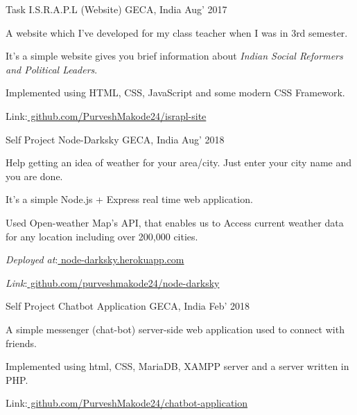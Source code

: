 \begin{cventries}
  \cventry
    {Task} %
    {I.S.R.A.P.L (Website)} %
    {GECA, India} %
    {Aug’ 2017} %
    {
      \begin{cvitems} %
        \item {A website which I’ve developed for my class teacher when I was in 3rd semester. }
        \item {It’s a simple website gives you brief information about {\em Indian Social Reformers and Political Leaders}.}
        \item {Implemented using HTML, CSS, JavaScript and some modern CSS Framework.}
        \item {Link:\href{https://github.com/PurveshMakode24/israpl-site}{ github.com/PurveshMakode24/israpl-site}}
      \end{cvitems}
    }
  \cventry     
    {Self Project} %
    {Node-Darksky} %
    {GECA, India} %
    {Aug’ 2018} %
    {
      \begin{cvitems} %
        \item {Help getting an idea of weather for your area/city. Just enter your city name and you are done.}
        \item {It's a simple Node.js + Express real time web application.}
        \item {Used Open-weather Map's API, that enables us to Access current weather data for any location including over 200,000 cities.}
        \item {{\em Deployed at}:\href{https://node-darksky.herokuapp.com/}{ node-darksky.herokuapp.com}}
        \item {{\em Link}:\href{https://github.com/purveshmakode24/node-darksky}{ github.com/purveshmakode24/node-darksky}}
      \end{cvitems}
    }

  \cventry
 	{Self Project}  
    {Chatbot Application} %
    {GECA, India} %
    {Feb’ 2018} %
    {
      \begin{cvitems} %
      	\item {A simple messenger (chat-bot) server-side web application used to connect with friends.}
        \item {Implemented using html, CSS, MariaDB, XAMPP server and a server written in PHP.}
        \item {Link:\href{https://github.com/PurveshMakode24/chatbot-application}{ github.com/PurveshMakode24/chatbot-application}} 
      \end{cvitems}
    }
\end{cventries}
